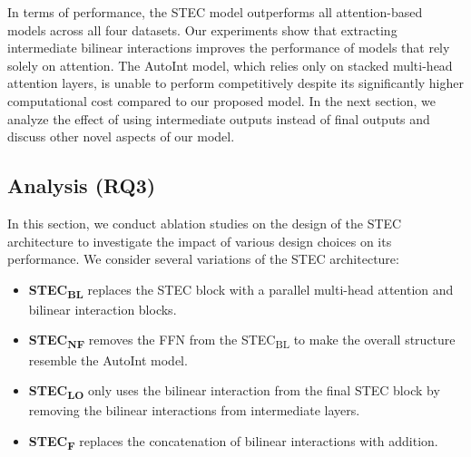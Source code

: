 \documentclass{article}
\begin{document}
In terms of performance, the STEC model outperforms all attention-based models across all four datasets. Our experiments show that extracting intermediate bilinear interactions improves the performance of models that rely solely on attention. The AutoInt model, which relies only on stacked multi-head attention layers, is unable to perform competitively despite its significantly higher computational cost compared to our proposed model. In the next section, we analyze the effect of using intermediate outputs instead of final outputs and discuss other novel aspects of our model.

\subsection{Analysis (RQ3)}



In this section, we conduct ablation studies on the design of the STEC architecture to investigate the impact of various design choices on its performance. We consider several variations of the STEC architecture:

\begin{itemize}
  \item \textbf{STEC\textsubscript{BL}} replaces the STEC block with a parallel multi-head attention and bilinear interaction blocks.
  \item \textbf{STEC\textsubscript{NF}} removes the FFN from the STEC\textsubscript{BL} to make the overall structure resemble the AutoInt model.
  \item \textbf{STEC\textsubscript{LO}} only uses the bilinear interaction from the final STEC block by removing the bilinear interactions from intermediate layers.
  \item \textbf{STEC\textsubscript{F}} replaces the concatenation of bilinear interactions with addition.
\end{itemize}
\end{document}
